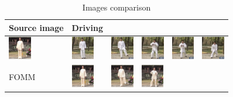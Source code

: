 \documentclass{article}
\begin{document}
\begin{table}[t]
\caption{Images comparison}
\label{table:images}
\vskip 0.15in
\begin{center}
\begin{small}
\begin{sc}
\begin{tabular}{m{1.0cm}m{1.0cm}m{1.0cm}m{1.0cm}m{1.0cm}m{1.0cm}}
\toprule
Source image & Driving\\
\toprule
\includegraphics[width=1cm, height=1cm]{images/intro_image/source.png} &
\includegraphics[width=1cm, height=1cm]{images/intro_image/Driving_1.png} &
\includegraphics[width=1cm, height=1cm]{images/intro_image/Driving_2.png} &
\includegraphics[width=1cm, height=1cm]{images/intro_image/Driving_4.png} &
\includegraphics[width=1cm, height=1cm]{images/intro_image/Driving_5.png} &
\includegraphics[width=1cm, height=1cm]{images/intro_image/Driving_6.png} \\
\midrule
FOMM & \includegraphics[width=1cm, height=1cm]{images/intro_image/animate_1_fomm.png} &
\includegraphics[width=1cm, height=1cm]{images/intro_image/animate_2_fomm.png} &
\includegraphics[width=1cm, height=1cm]{images/intro_image/animate_4_fomm.png} &

\end{tabular}
\end{sc}
\end{small}
\end{center}
\end{table}
\end{document}

